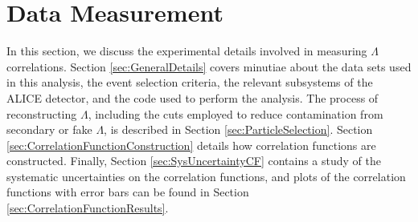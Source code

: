 \section{Data Measurement}
\label{sec:DataMeasurement}

In this section, we discuss the experimental details involved in measuring $\Lambda$ correlations.
Section \ref{sec:GeneralDetails} covers minutiae about the data sets used in this analysis, the event selection criteria, the relevant subsystems of the ALICE detector, and the code used to perform the analysis.
The process of reconstructing $\Lambda$, including the cuts employed to reduce contamination from secondary or fake $\Lambda$, is described in Section \ref{sec:ParticleSelection}.
Section \ref{sec:CorrelationFunctionConstruction} details how correlation functions are constructed.
Finally, Section \ref{sec:SysUncertaintyCF} contains a study of the systematic uncertainties on the correlation functions, and plots of the correlation functions with error bars can be found in Section \ref{sec:CorrelationFunctionResults}.





